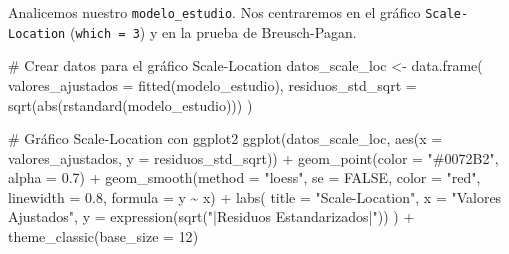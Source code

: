 \documentclass[
  letterpaper,
  DIV=11,
  numbers=noendperiod]{scrreprt}
\newenvironment{Shaded}{\begin{snugshade}}{\end{snugshade}}
\newcommand{\AttributeTok}[1]{\textcolor[rgb]{0.40,0.45,0.13}{#1}}
\newcommand{\CommentTok}[1]{\textcolor[rgb]{0.37,0.37,0.37}{#1}}
\newcommand{\ConstantTok}[1]{\textcolor[rgb]{0.56,0.35,0.01}{#1}}
\newcommand{\DecValTok}[1]{\textcolor[rgb]{0.68,0.00,0.00}{#1}}
\newcommand{\FloatTok}[1]{\textcolor[rgb]{0.68,0.00,0.00}{#1}}
\newcommand{\FunctionTok}[1]{\textcolor[rgb]{0.28,0.35,0.67}{#1}}
\newcommand{\NormalTok}[1]{\textcolor[rgb]{0.00,0.23,0.31}{#1}}
\newcommand{\OtherTok}[1]{\textcolor[rgb]{0.00,0.23,0.31}{#1}}
\newcommand{\SpecialCharTok}[1]{\textcolor[rgb]{0.37,0.37,0.37}{#1}}
\newcommand{\StringTok}[1]{\textcolor[rgb]{0.13,0.47,0.30}{#1}}
\begin{document}
\begin{tcolorbox}[enhanced jigsaw, leftrule=.75mm, breakable, colbacktitle=quarto-callout-tip-color!10!white, bottomrule=.15mm, colframe=quarto-callout-tip-color-frame, toprule=.15mm, colback=white, coltitle=black, bottomtitle=1mm, left=2mm, title=\textcolor{quarto-callout-tip-color}{\faLightbulb}\hspace{0.5em}{Ejemplo de un modelo válido}, opacityback=0, arc=.35mm, opacitybacktitle=0.6, toptitle=1mm, titlerule=0mm, rightrule=.15mm]

Analicemos nuestro \texttt{modelo\_estudio}. Nos centraremos en el
gráfico \texttt{Scale-Location} (\texttt{which\ =\ 3}) y en la prueba de
Breusch-Pagan.

\begin{Shaded}
\begin{Highlighting}[]
\CommentTok{\# Crear datos para el gráfico Scale{-}Location}
\NormalTok{datos\_scale\_loc }\OtherTok{\textless{}{-}} \FunctionTok{data.frame}\NormalTok{(}
  \AttributeTok{valores\_ajustados =} \FunctionTok{fitted}\NormalTok{(modelo\_estudio),}
  \AttributeTok{residuos\_std\_sqrt =} \FunctionTok{sqrt}\NormalTok{(}\FunctionTok{abs}\NormalTok{(}\FunctionTok{rstandard}\NormalTok{(modelo\_estudio)))}
\NormalTok{)}

\CommentTok{\# Gráfico Scale{-}Location con ggplot2}
\FunctionTok{ggplot}\NormalTok{(datos\_scale\_loc, }\FunctionTok{aes}\NormalTok{(}\AttributeTok{x =}\NormalTok{ valores\_ajustados, }\AttributeTok{y =}\NormalTok{ residuos\_std\_sqrt)) }\SpecialCharTok{+}
  \FunctionTok{geom\_point}\NormalTok{(}\AttributeTok{color =} \StringTok{"\#0072B2"}\NormalTok{, }\AttributeTok{alpha =} \FloatTok{0.7}\NormalTok{) }\SpecialCharTok{+}
  \FunctionTok{geom\_smooth}\NormalTok{(}\AttributeTok{method =} \StringTok{"loess"}\NormalTok{, }\AttributeTok{se =} \ConstantTok{FALSE}\NormalTok{, }\AttributeTok{color =} \StringTok{"red"}\NormalTok{, }\AttributeTok{linewidth =} \FloatTok{0.8}\NormalTok{, }\AttributeTok{formula =}\NormalTok{ y }\SpecialCharTok{\textasciitilde{}}\NormalTok{ x) }\SpecialCharTok{+}
  \FunctionTok{labs}\NormalTok{(}
    \AttributeTok{title =} \StringTok{"Scale{-}Location"}\NormalTok{,}
    \AttributeTok{x =} \StringTok{"Valores Ajustados"}\NormalTok{,}
    \AttributeTok{y =} \FunctionTok{expression}\NormalTok{(}\FunctionTok{sqrt}\NormalTok{(}\StringTok{"|Residuos Estandarizados|"}\NormalTok{))}
\NormalTok{  ) }\SpecialCharTok{+}
  \FunctionTok{theme\_classic}\NormalTok{(}\AttributeTok{base\_size =} \DecValTok{12}\NormalTok{)}


\end{Highlighting}
\end{Shaded}
\end{tcolorbox}
\end{document}
